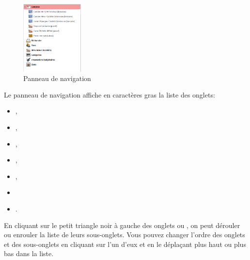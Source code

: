 \begin{figure}%
	\vspace{-\intextsep}				%
	\centering							%
	\includegraphics[width=0.28\textwidth]{image/screenshot/home_navigation}
	\vspace{-5pt}						%
	\captionsetup{%
		format=plain,					%
		name=Fig.,						%
		justification=centering,		%
		labelsep=newline				%
		}
	\caption{Panneau de navigation}		%
	\vspace{-40pt}						%
	\label{home_navigation}
\end{figure}

Le panneau de navigation affiche en caractères gras la liste des onglets:

	\begin{itemize}
		\item {},
		\item {},
		\item {},
		\item {},
		\item {},
		\item {}
		\item {}.
	\end{itemize}
En cliquant sur le petit triangle noir à gauche des onglets  ou , on peut dérouler ou enrouler la liste de leurs sous-onglets. Vous pouvez changer l'ordre des onglets et des sous-onglets en cliquant sur l'un d'eux et en le déplaçant plus haut ou plus bas dans la liste.

